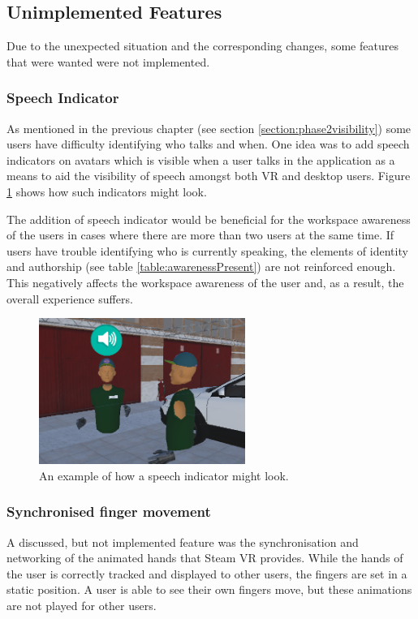 \subsection{Unimplemented Features}
Due to the unexpected situation and the corresponding changes, some features that were wanted were not implemented. 

\subsubsection{Speech Indicator}
As mentioned in the previous chapter (see section \ref{section:phase2visibility}) some users have difficulty identifying who talks and when. One idea was to add speech indicators on avatars which is visible when a user talks in the application as a means to aid the visibility of speech amongst both VR and desktop users. Figure \ref{fig:phase3_speech} shows how such indicators might look.

The addition of speech indicator would be beneficial for the workspace awareness of the users in cases where there are more than two users at the same time. If users have trouble identifying who is currently speaking, the elements of identity and authorship (see table \ref{table:awarenessPresent}) are not reinforced enough. This negatively affects the workspace awareness of the user and, as a result, the overall experience suffers.


\begin{figure}[H]
  \centering
   \captionsetup{width=.6\linewidth}
    \includegraphics[width=0.6\textwidth]{fig/phase_3/implementation/speechIndicator.PNG}
 \caption{An example of how a speech indicator might look.}
\label{fig:phase3_speech}
\end{figure}


\subsubsection{Synchronised finger movement}
A discussed, but not implemented feature was the synchronisation and networking of the animated hands that Steam VR provides. While the hands of the user is correctly tracked and displayed to other users, the fingers are set in a static position. A user is able to see their own fingers move, but these animations are not played for other users.

